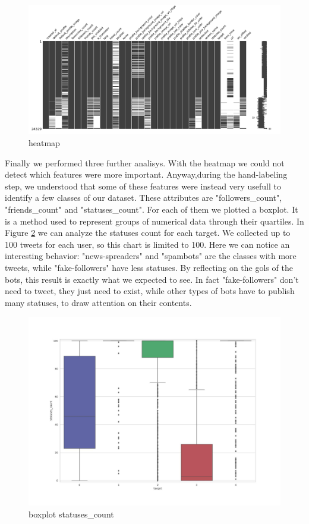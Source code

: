 \begin{figure}
	\centering
	\includegraphics[width=\columnwidth]{chapter3/figure/msno.png}
	\caption{heatmap}
	\label{fig:msno}
\end{figure}

\newpage
Finally we performed three further analisys. With the heatmap we could not detect which features were more important. Anyway,during the hand-labeling step, we understood that some of these features were instead very usefull to identify a few classes of our dataset. These attributes are "followers\_count", "friends\_count" and "statuses\_count". For each of them we plotted a boxplot. It is a method used to represent groups of numerical data through their quartiles. In Figure \ref{fig:box_statuses} we can analyze the statuses count for each target. We collected up to 100 tweets for each user, so this chart is limited to 100. Here we can notice an interesting behavior: "news-spreaders" and "spambots" are the classes with more tweets, while "fake-followers" have less statuses. By reflecting on the gols of the bots, this result is exactly what we expected to see. In fact "fake-followers" don't need to tweet, they just need to exist, while other types of bots have to publish many statuses, to draw attention on their contents.

\begin{figure}
	\centering
	\includegraphics[width=\columnwidth]{chapter3/figure/boxplot_statuses.jpg}
	\caption{boxplot statuses\_count}
	\label{fig:box_statuses}
\end{figure}
\newpage

